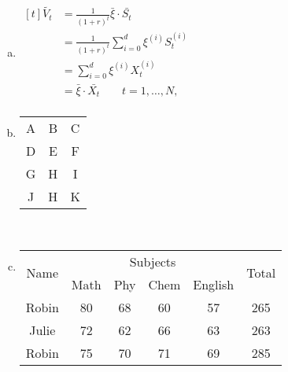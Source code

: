 \documentclass[11pt,a4paper]{article}
\begin{document}
	{\LARGE	\begin{enumerate}[(a)]
		\item $ 
		 \begin{aligned}[t]
			\tilde{V_t}&=\frac{1}{(1+r)^t}\bar{\xi}\cdot\bar{S_t}\\	
			&=\frac{1}{(1+r)^t}\sum_{i=0}^d {\xi^{(i)}}{S_t^{(i)}}\\
			&=\sum_{i=0}^d {\xi^{(i)}}{X_t^{(i)}}\\
			&=\bar{\xi}\cdot\bar{X_t}\quad \quad t=1,\dots,N,\\	
		\end{aligned}$\\[3ex] 
		
		
		\item
		\begin{tabular}{*{3}{c}}
			\toprule

			A&B&C\\	
			\cmidrule{1-2}D&E&F\\
			\cmidrule(lr{12pt}){2-3}G&H&I\\
			\cmidrule[.15cm](l{5pt}r{5pt}){1-1}J&H&K\\
			\bottomrule
		\end{tabular}\\[3ex]
	
	
	
		\item
		
			\begin{tabular}{|c|c|c|c|c|c|}
				\cline{1-6}
				\multirow{2}{*}{Name}&\multicolumn{4}{c|}{Subjects}&\multirow{2}{*}{Total}\\
				\cline{2-5}
				&Math&Phy&Chem&English& \\ 
				\midrule
				\cline{1-6}
			Robin&80&68&60&57&265\\
			\cline{1-6}
			Julie&72&62&66&63&263\\
			\cline{1-6}
			Robin&75&70&71&69&285\\
			
			\cline{1-6}
		\end{tabular}
		


	\end{enumerate}
	}
\end{document}

